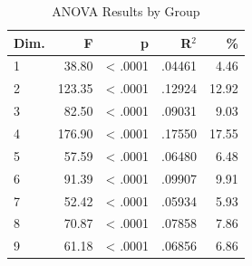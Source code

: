 \begin{table}[H]
  \centering
  \caption{ANOVA Results by Group}
  \label{tab:anova_group}
  \begin{tabular}{l r r r r}
    Dim. & F & p & R$^2$ & \% \\
    \hline
    1 & 38.80 & < .0001 & .04461 & 4.46 \\
    2 & 123.35 & < .0001 & .12924 & 12.92 \\
    3 & 82.50 & < .0001 & .09031 & 9.03 \\
    4 & 176.90 & < .0001 & .17550 & 17.55 \\
    5 & 57.59 & < .0001 & .06480 & 6.48 \\
    6 & 91.39 & < .0001 & .09907 & 9.91 \\
    7 & 52.42 & < .0001 & .05934 & 5.93 \\
    8 & 70.87 & < .0001 & .07858 & 7.86 \\
    9 & 61.18 & < .0001 & .06856 & 6.86 \\
  \end{tabular}
\end{table}
